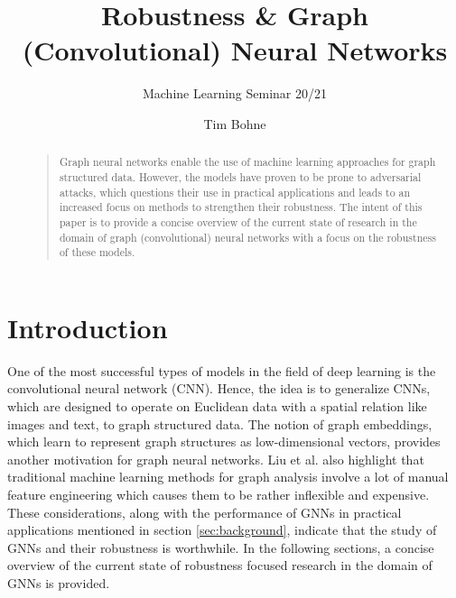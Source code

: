 \documentclass[a4paper,preprint]{sig-alternate}
\begin{document}
\title{Robustness \& Graph (Convolutional) Neural Networks}

\subtitle{Machine Learning Seminar 20/21}

%
\author{
%
\alignauthor Tim Bohne\\
}

\maketitle

\begin{abstract}
    \begin{quote}
    Graph neural networks enable the use of machine learning approaches for graph structured data.
    However, the models have proven to be prone to adversarial attacks, which questions their use in practical applications
    and leads to an increased focus on methods to strengthen their robustness. The intent of this paper is to provide a concise overview
    of the current state of research in the domain of graph (convolutional) neural networks with a focus on the robustness of these models. 
    \end{quote}
\end{abstract}

\section{Introduction}

One of the most successful types of models in the field of deep learning is the convolutional neural network (CNN).
Hence, the idea is to generalize CNNs, which are designed to operate on Euclidean data with a spatial relation like 
images and text, to graph structured data. \cite{Liu_2020}
The notion of graph embeddings, which learn to represent graph structures as low-dimensional vectors, provides
another motivation for graph neural networks. \cite{Liu_2020}
Liu et al. also highlight that traditional machine learning methods for graph analysis involve a lot of manual feature engineering
which causes them to be rather inflexible and expensive.
These considerations, along with the performance of GNNs in practical applications mentioned in section \ref{sec:background}, 
indicate that the study of GNNs and their robustness is worthwhile.
In the following sections, a concise overview of the current state of robustness focused research in the domain of GNNs is provided.\newline
\end{document}
